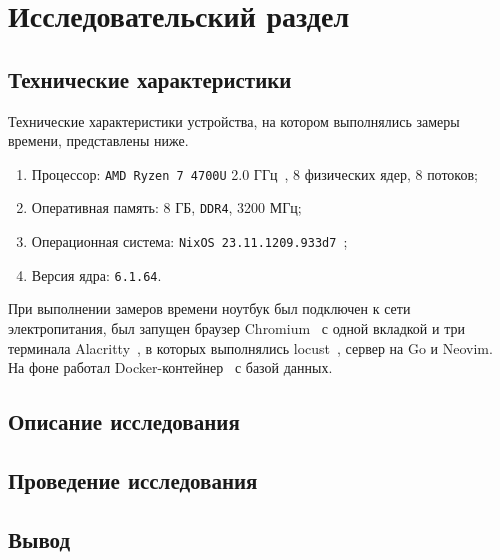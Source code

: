 \section{Исследовательский раздел}

\subsection{Технические характеристики}

Технические характеристики устройства, на котором выполнялись замеры времени, представлены ниже.
\begin{enumerate}
    \item Процессор: \texttt{AMD Ryzen 7 4700U} 2.0 ГГц~\cite{amd}, 8 физических ядер, 8 потоков;
    \item Оперативная память: 8 ГБ, \texttt{DDR4}, 3200 МГц;
    \item Операционная система: \texttt{NixOS 23.11.1209.933d7}~\cite{nixos};
    \item Версия ядра: \texttt{6.1.64}.
\end{enumerate}

При выполнении замеров времени ноутбук был подключен к сети электропитания, был запущен браузер Chromium~\cite{chromium} с одной вкладкой и три терминала Alacritty~\cite{alacritty}, в которых выполнялись locust~\cite{locust}, сервер на Go и Neovim.
На фоне работал Docker-контейнер~\cite{docker} с базой данных.

\subsection{Описание исследования}

\cite{locust}

\subsection{Проведение исследования}

\subsection{Вывод}
